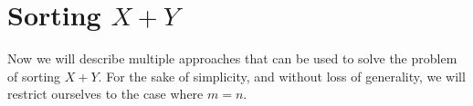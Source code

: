 \chapter{Sorting $X + Y$}

Now we will describe multiple approaches that can be used to solve the problem
of sorting $X + Y$. For the sake of simplicity, and without loss of generality,
we will restrict ourselves to the case where $m = n$.
